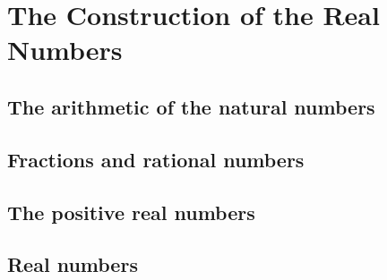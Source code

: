 \chapter{The Construction of the Real Numbers}
\section{The arithmetic of the natural numbers}
\section{Fractions and rational numbers}
\section{The positive real numbers}
\section{Real numbers}

